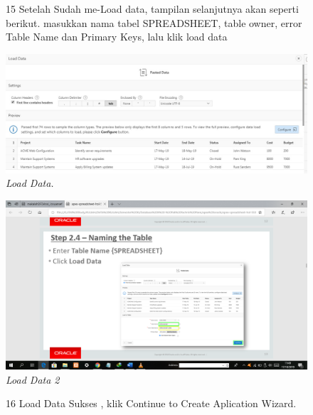 \begin{enumerate}
\begin{figure}
\item[15] Setelah Sudah me-Load data, tampilan selanjutnya akan seperti berikut. masukkan nama tabel {SPREADSHEET}, table owner, error Table Name dan Primary Keys, lalu klik load data

    \begin{center}
\includegraphics[scale=0.4]{figures/pict(10).jpg}
    \caption{\textit{Load Data.}}
        \end{center}
\label{gambar}
\end{figure}

\begin{figure}
    \begin{center}
\includegraphics[scale=0.2]{figures/pict(11).png}
    \caption{\textit{Load Data 2}}
        \end{center}
\label{gambar}
\end{figure}

\begin{figure}
\item[16] Load Data Sukses , klik Continue to Create Aplication Wizard.


\end{figure}
\end{enumerate}
